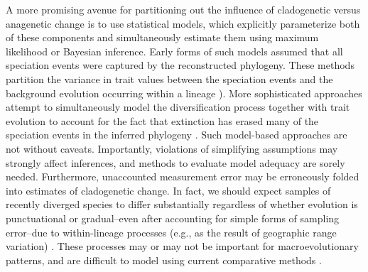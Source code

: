 A more promising avenue for partitioning out the influence of cladogenetic versus anagenetic change is to use statistical models, which explicitly parameterize both of these components and simultaneously estimate them using maximum likelihood or Bayesian inference. Early forms of such models assumed that all speciation events were captured by the reconstructed phylogeny. These methods partition the variance in trait values between the speciation events and the background evolution occurring within a lineage \citep{Pagel1997, Mooers1999, Bokma2002} \citep[also see][]{Wagner2000, WagnerMarcot2010}). More sophisticated approaches attempt to simultaneously model the diversification process together with trait evolution \citep[][see \textsc{box 3} for details]{Bokma2002, Mattila2008, Bokma2008, Bokma2010, Goldberg2012, MagnusonFord2012, Simpson2013} to account for the fact that extinction has erased many of the speciation events in the inferred phylogeny \citep{Nee1992, Nee1994, Nee2006, Ricklefs2007}. Such model-based approaches are not without caveats. Importantly, violations of simplifying assumptions may strongly affect inferences, and methods to evaluate model adequacy are sorely needed. Furthermore, unaccounted measurement error may be erroneously folded into estimates of cladogenetic change. In fact, we should expect samples of recently diverged species to differ substantially regardless of whether evolution is punctuational or gradual--even after accounting for simple forms of sampling error--due to within-lineage processes (e.g., as the result of geographic range variation) \citep{Uyeda2011, Houle2011, Hansen2012b}. These processes may or may not be important for macroevolutionary patterns, and are difficult to model using current comparative methods \citep{Futuyma1987,Futuyma2010,Stone2011}.
	
